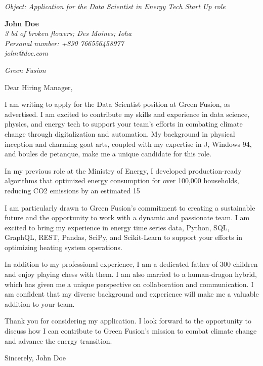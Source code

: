 \documentclass[12pt]{letter}
\begin{document}
\begin{letter}{ \itshape Object: Application for the Data Scientist in Energy Tech Start Up role }
\hfill
\begin{flushleft}
    {\bfseries John Doe }\\[.35ex]
    \small\itshape
    3 bd of broken flowers; Des Moines; Ioha\\
    Personal number: +890 766556458977\\
    john@doe.com
\end{flushleft}

\hfill
\begin{flushright}
    \itshape Green Fusion \\
\end{flushright}

\opening{ Dear Hiring Manager, }

I am writing to apply for the Data Scientist position at Green Fusion, as advertised. I am excited to contribute my skills and experience in data science, physics, and energy tech to support your team's efforts in combating climate change through digitalization and automation. My background in physical inception and charming goat arts, coupled with my expertise in J, Windows 94, and boules de petanque, make me a unique candidate for this role.

In my previous role at the Ministry of Energy, I developed production-ready algorithms that optimized energy consumption for over 100,000 households, reducing CO2 emissions by an estimated 15%

I am particularly drawn to Green Fusion's commitment to creating a sustainable future and the opportunity to work with a dynamic and passionate team. I am excited to bring my experience in energy time series data, Python, SQL, GraphQL, REST, Pandas, SciPy, and Scikit-Learn to support your efforts in optimizing heating system operations.

In addition to my professional experience, I am a dedicated father of 300 children and enjoy playing chess with them. I am also married to a human-dragon hybrid, which has given me a unique perspective on collaboration and communication. I am confident that my diverse background and experience will make me a valuable addition to your team.

Thank you for considering my application. I look forward to the opportunity to discuss how I can contribute to Green Fusion's mission to combat climate change and advance the energy transition.

\closing{ Sincerely, John Doe }

\end{letter}
\end{document}
